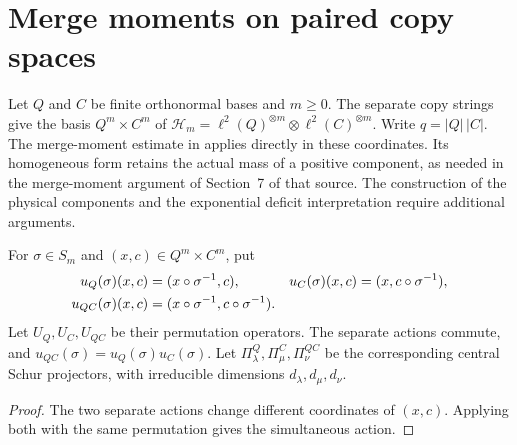 \section{Merge moments on paired copy spaces}
\label{sec:pair_merge_moment}

Let $Q$ and $C$ be finite orthonormal bases and $m\ge0$. The separate
copy strings give the basis $Q^m\times C^m$ of
$\mathcal H_m=\ell^2(Q)^{\otimes m}\otimes\ell^2(C)^{\otimes m}$.
Write $q=|Q|\,|C|$. The merge-moment estimate in
\cite[Lemma~6.1(3)]{OpenAI2026AreaLaw} applies directly in these coordinates.
Its homogeneous form retains the actual mass of a positive component,
as needed in the merge-moment argument of Section~7 of that source.
The construction of the physical components and the exponential deficit
interpretation require additional arguments.

\begin{definition}
\label{def:pair_copy_actions}
\leanok
For $\sigma\in S_m$ and $(x,c)\in Q^m\times C^m$, put
\begin{align}
 u_Q(\sigma)(x,c)&=(x\circ\sigma^{-1},c), &
 u_C(\sigma)(x,c)&=(x,c\circ\sigma^{-1}),\notag\\
 u_{QC}(\sigma)(x,c)&=(x\circ\sigma^{-1},c\circ\sigma^{-1}).
 \label{eq:pair_copy_actions}
\end{align}
Let $U_Q,U_C,U_{QC}$ be their permutation operators. The separate actions
commute, and $u_{QC}(\sigma)=u_Q(\sigma)u_C(\sigma)$.
Let $\Pi^Q_\lambda,\Pi^C_\mu,\Pi^{QC}_\nu$ be the corresponding central
Schur projectors, with irreducible dimensions $d_\lambda,d_\mu,d_\nu$.
\end{definition}
\begin{proof}
\leanok
The two separate actions change different coordinates of $(x,c)$.
Applying both with the same permutation gives the simultaneous action.
\end{proof}

